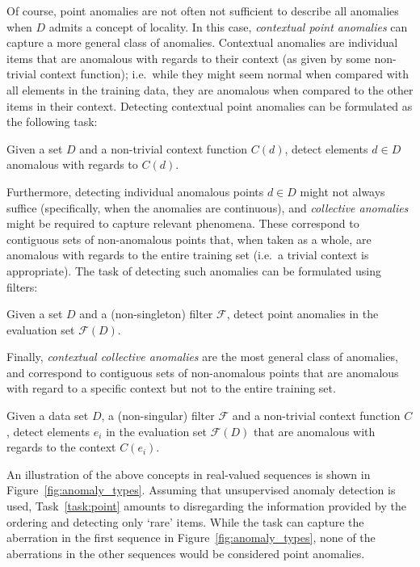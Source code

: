 Of course, point anomalies are not often not sufficient to describe all anomalies when $D$ admits a concept of locality. In this case, \emph{contextual point anomalies} can capture a more general class of anomalies. Contextual anomalies are individual items that are anomalous with regards to their context (as given by some non-trivial context function); i.e.\ while they might seem normal when compared with all elements in the training data, they are anomalous when compared to the other items in their context. Detecting contextual point anomalies can be formulated as the following task:

\begin{task}
\label{task:contextual}
  Given a set $D$ and a non-trivial context function $C(d)$, detect elements $d \in D$ anomalous with regards to $C(d)$.
\end{task}

Furthermore, detecting individual anomalous points $d \in D$ might not always suffice (specifically, when the anomalies are continuous), and \emph{collective anomalies} might be required to capture relevant phenomena. These correspond to contiguous sets of non-anomalous points that, when taken as a whole, are anomalous with regards to the entire training set (i.e.\ a trivial context is appropriate). The task of detecting such anomalies can be formulated using filters:

\begin{task}
\label{task:collective}
  Given a set $D$ and a (non-singleton) filter $\mathcal{F}$, detect point anomalies in the evaluation set $\mathcal{F}(D)$.
\end{task}

Finally, \emph{contextual collective anomalies} are the most general class of anomalies, and correspond to contiguous sets of non-anomalous points that are anomalous with regard to a specific context but not to the entire training set.

\begin{task}
\label{task:contextual_power}
  Given a data set $D$, a (non-singular) filter $\mathcal{F}$ and a non-trivial context function $C$, detect elements $e_i$ in the evaluation set $\mathcal{F}(D)$ that are anomalous with regards to the context $C(e_i)$.
\end{task}

An illustration of the above concepts in real-valued sequences is shown in Figure~\ref{fig:anomaly_types}. Assuming that unsupervised anomaly detection is used, Task~\ref{task:point} amounts to disregarding the information provided by the ordering and detecting only `rare' items. While the task can capture the aberration in the first sequence in Figure~\ref{fig:anomaly_types}, none of the aberrations in the other sequences would be considered point anomalies.

